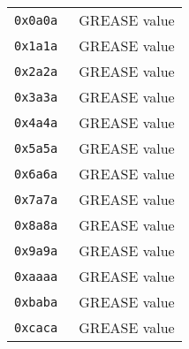 \documentclass[documentation]{subfiles}
\begin{document}
\begin{minipage}{.48\textwidth}
\begin{longtable}{>{\tt}rl}
        0x0a0a & GREASE value\\
        0x1a1a & GREASE value\\
        0x2a2a & GREASE value\\
        0x3a3a & GREASE value\\
        0x4a4a & GREASE value\\
        0x5a5a & GREASE value\\
        0x6a6a & GREASE value\\
        0x7a7a & GREASE value\\
        0x8a8a & GREASE value\\
        0x9a9a & GREASE value\\
        0xaaaa & GREASE value\\
        0xbaba & GREASE value\\
        0xcaca & GREASE value\\
        \bottomrule
    \end{longtable}
\end{minipage}
\hfill
\end{document}
